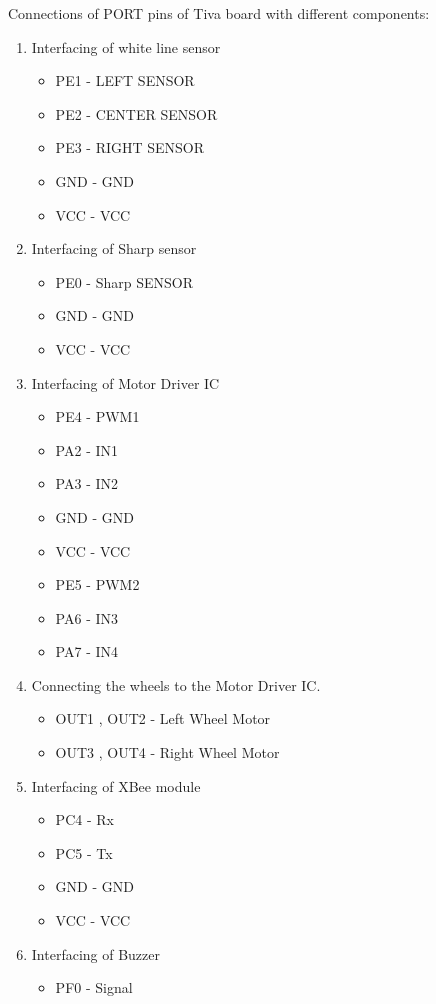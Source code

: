 \documentclass[a4paper,12pt,oneside]{book}
\begin{document}
Connections of PORT pins of Tiva board with different components:\\
\begin {enumerate}
\item Interfacing of white line sensor
\begin{itemize}
\item PE1  - LEFT   SENSOR
\item PE2  - CENTER SENSOR
\item PE3  - RIGHT  SENSOR
\item GND  - GND
\item VCC  - VCC
\end{itemize}
\item Interfacing of Sharp sensor
\begin{itemize}
\item PE0  - Sharp   SENSOR
\item GND  - GND
\item VCC  - VCC
\end{itemize}
\item Interfacing of Motor Driver IC
\begin{itemize}
\item PE4  - PWM1
\item PA2  - IN1
\item PA3  - IN2
\item GND  - GND
\item VCC  - VCC
\item PE5  - PWM2
\item PA6  - IN3
\item PA7  - IN4
\end{itemize}
\item Connecting the wheels to the Motor Driver IC.
\begin{itemize}
\item OUT1 , OUT2 - Left Wheel Motor
\item OUT3 , OUT4 - Right Wheel Motor
\end{itemize} 
\item Interfacing of XBee module
\begin{itemize}
\item PC4  - Rx
\item PC5  - Tx
\item GND  - GND
\item VCC  - VCC
\end{itemize}
\item Interfacing of Buzzer
\begin{itemize}
\item PF0  - Signal

\end{itemize}
\end{enumerate}
\end{document}
